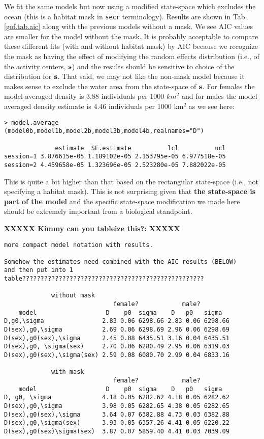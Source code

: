 We fit the same models but now using a modified state-space which
excludes the ocean (this is a habitat mask in \mbox{\tt secr} terminology).
Results are shown in Tab. \ref{gof.tab.aic}
along with the previous models without a mask. 
We see AIC values are smaller for the model without the mask. It is
probably acceptable to
compare these different fits (with and without habitat mask) by AIC
 because we recognize the mask as having the effect of modifying the
 random 
effects distribution (i.e., of the activity centers, ${\bf s}$) and the results
should be sensitive to choice of the distribution for ${\bf s}$. That
said, we may not like the non-mask model because it makes sense to 
exclude the water area from the state-space  of ${\bf s}$.
For females the model-averaged density is 3.88 individuals per 1000 $km^2$ and for
males the model-averaged density estimate is 4.46 individuals per
1000 km$^2$ as we see here:
{\small
\begin{verbatim}
> model.average (model0b,model1b,model2b,model3b,model4b,realnames="D")

              estimate  SE.estimate          lcl          ucl
session=1 3.876615e-05 1.189102e-05 2.153795e-05 6.977518e-05
session=2 4.459658e-05 1.323696e-05 2.523280e-05 7.882022e-05
\end{verbatim}
}
This is quite a bit higher than that based on the rectangular state-space
(i.e., not specifying a habitat mask). This is not surprising given
that {\bf the state-space is part of the model} and the specific
state-space modification we made here should be extremely important
from a biological standpoint.

{\bf XXXXX Kimmy can you tableize this?: XXXXX}
\begin{verbatim}
more compact model notation with results.

Somehow the estimates need combined with the AIC results (BELOW) 
and then put into 1 table??????????????????????????????????????????????????

             without mask
                              female?            male?
    model                   D    p0  sigma    D   p0   sigma
D,g0,\sigma                2.83 0.06 6298.66 2.83 0.06 6298.66
D(sex),g0,\sigma           2.69 0.06 6298.69 2.96 0.06 6298.69
D(sex),g0(sex),\sigma      2.45 0.08 6435.51 3.16 0.04 6435.51
D(sex),g0, \sigma(sex)     2.70 0.06 6280.49 2.95 0.06 6319.03
D(sex),g0(sex),\sigma(sex) 2.59 0.08 6080.70 2.99 0.04 6833.16

             with mask 
                              female?            male?
    model                   D    p0  sigma    D   p0   sigma
D, g0, \sigma              4.18 0.05 6282.62 4.18 0.05 6282.62
D(sex),g0,\sigma           3.98 0.05 6282.65 4.38 0.05 6282.65
D(sex),g0(sex),\sigma      3.64 0.07 6382.88 4.73 0.03 6382.88
D(sex),g0,\sigma(sex)      3.93 0.05 6357.26 4.41 0.05 6220.22
D(sex),g0(sex)\sigma(sex)  3.87 0.07 5859.40 4.41 0.03 7039.09
\end{verbatim}





